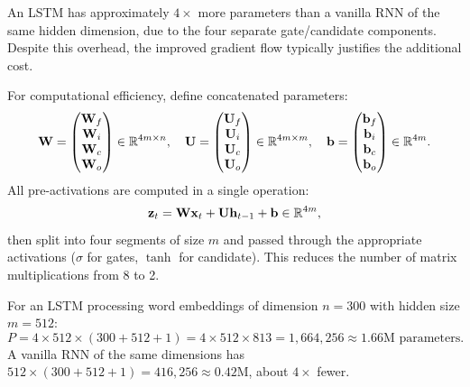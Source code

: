 \documentclass[11pt,a4paper]{article}
\begin{document}
\begin{remark}
An LSTM has approximately $4\times$ more parameters than a vanilla
RNN of the same hidden dimension, due to the four separate
gate/candidate components.  Despite this overhead, the improved
gradient flow typically justifies the additional cost.
\end{remark}

\begin{definition}
\label{def:compact}
For computational efficiency, define concatenated parameters:
\begin{equation}
  \mathbf{W} = \begin{pmatrix} \mathbf{W}_f \\ \mathbf{W}_i \\
    \mathbf{W}_c \\ \mathbf{W}_o \end{pmatrix} \in \mathbb{R}^{4m \times n},
  \quad
  \mathbf{U} = \begin{pmatrix} \mathbf{U}_f \\ \mathbf{U}_i \\
    \mathbf{U}_c \\ \mathbf{U}_o \end{pmatrix} \in \mathbb{R}^{4m \times m},
  \quad
  \mathbf{b} = \begin{pmatrix} \mathbf{b}_f \\ \mathbf{b}_i \\
    \mathbf{b}_c \\ \mathbf{b}_o \end{pmatrix} \in \mathbb{R}^{4m}.
  \label{eq:compact-params}
\end{equation}
All pre-activations are computed in a single operation:
\[
  \mathbf{z}_t = \mathbf{W}\mathbf{x}_t + \mathbf{U}\mathbf{h}_{t-1}
    + \mathbf{b} \in \mathbb{R}^{4m},
\]
then split into four segments of size $m$ and passed through the
appropriate activations ($\sigma$ for gates, $\tanh$ for candidate).
This reduces the number of matrix multiplications from 8 to 2.
\end{definition}

\begin{example}
\label{ex:param-count}
For an LSTM processing word embeddings of dimension $n = 300$ with
hidden size $m = 512$:
\[
  P = 4 \times 512 \times (300 + 512 + 1) = 4 \times 512 \times 813
    = 1{,}664{,}256 \approx 1.66\text{M parameters}.
\]
A vanilla RNN of the same dimensions has
$512 \times (300 + 512 + 1) = 416{,}256 \approx 0.42\text{M}$, about
$4\times$ fewer.
\end{example}
\end{document}
